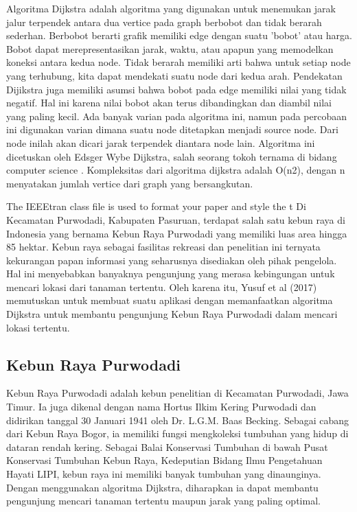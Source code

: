 \documentclass[conference]{IEEEtran}
\begin{document}
Algoritma Dijkstra adalah algoritma yang digunakan untuk
menemukan jarak jalur terpendek antara dua vertice pada
graph berbobot dan tidak berarah sederhan\cite{rosen2012discrete}. Berbobot
berarti grafik memiliki edge dengan suatu ’bobot’ atau harga.
Bobot dapat merepresentasikan jarak, waktu, atau apapun
yang memodelkan koneksi antara kedua node. Tidak berarah
memiliki arti bahwa untuk setiap node yang terhubung, kita
dapat mendekati suatu node dari kedua arah. Pendekatan Dijikstra
juga memiliki asumsi bahwa bobot pada edge memiliki
nilai yang tidak negatif. Hal ini karena nilai bobot akan
terus dibandingkan dan diambil nilai yang paling kecil. Ada
banyak varian pada algoritma ini, namun pada percobaan
ini digunakan varian dimana suatu node ditetapkan menjadi
source node. Dari node inilah akan dicari jarak terpendek
diantara node lain. Algoritma ini dicetuskan oleh Edsger
Wybe Dijkstra, salah seorang tokoh ternama di bidang computer
science \cite{yusuf2017implementasi}. Kompleksitas dari algoritma dijkstra adalah
O(n2), dengan n menyatakan jumlah vertice dari graph yang
bersangkutan.

The IEEEtran class file is used to format your paper and style the t
Di Kecamatan Purwodadi, Kabupaten Pasuruan, terdapat
salah satu kebun raya di Indonesia yang bernama Kebun
Raya Purwodadi yang memiliki luas area hingga 85 hektar.
Kebun raya sebagai fasilitas rekreasi dan penelitian ini ternyata
kekurangan papan informasi yang seharusnya disediakan oleh
pihak pengelola. Hal ini menyebabkan banyaknya pengunjung
yang merasa kebingungan untuk mencari lokasi dari tanaman
tertentu. Oleh karena itu, Yusuf et al (2017) memutuskan
untuk membuat suatu aplikasi dengan memanfaatkan algoritma
Dijkstra untuk membantu pengunjung Kebun Raya Purwodadi
dalam mencari lokasi tertentu.

\subsection{Kebun Raya Purwodadi}
Kebun Raya Purwodadi adalah kebun penelitian di Kecamatan
Purwodadi, Jawa Timur. Ia juga dikenal dengan nama
Hortus Ilkim Kering Purwodadi dan didirikan tanggal 30 Januari
1941 oleh Dr. L.G.M. Baas Becking. Sebagai cabang dari
Kebun Raya Bogor, ia memiliki fungsi mengkoleksi tumbuhan
yang hidup di dataran rendah kering. Sebagai Balai Konservasi
Tumbuhan di bawah Pusat Konservasi Tumbuhan Kebun Raya,
Kedeputian Bidang Ilmu Pengetahuan Hayati LIPI, kebun raya
ini memiliki banyak tumbuhan yang dinaunginya. Dengan
menggunakan algoritma Dijkstra, diharapkan ia dapat membantu
pengunjung mencari tanaman tertentu maupun jarak
yang paling optimal.
\end{document}
